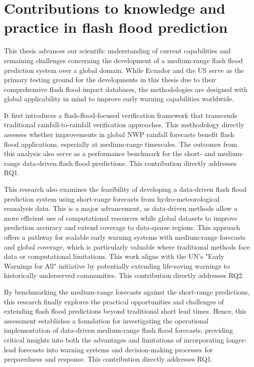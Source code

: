 \section{Contributions to knowledge and practice in flash flood prediction}

This thesis advances our scientific understanding of current capabilities and remaining challenges concerning the development of a medium-range flash flood prediction system over a global domain. While Ecuador and the US serve as the primary testing ground for the developments in this thesis due to their comprehensive flash flood impact databases, the methodologies are designed with global applicability in mind to improve early warning capabilities worldwide.

It  first introduces a flash-flood-focused verification framework that transcends traditional rainfall-to-rainfall verification approaches. This methodology directly assesses whether improvements in global NWP rainfall forecasts benefit flash flood applications, especially at medium-range timescales. The outcomes from this analysis also serve as a performance benchmark for the short- and medium-range data-driven flash flood predictions. This contribution directly addresses RQ1.

This  research also examines the feasibility of developing a data-driven flash flood prediction system using short-range forecasts from hydro-meteorological reanalysis data. This is a major advancement, as data-driven methods allow a more efficient use of computational resources while global datasets to improve prediction accuracy and extend coverage to data-sparse regions. This approach offers a pathway for scalable early warning systems with medium-range forecasts and global coverage, which is particularly valuable where traditional methods face data or computational limitations. This work aligns with the UN's "Early Warnings for All" initiative by potentially extending life-saving warnings to historically underserved communities. This contribution directly addresses RQ2.

By  benchmarking the medium-range forecasts against the short-range predictions, this research finally explores the practical opportunities and challenges of extending flash flood predictions beyond traditional short lead times. Hence, this assessment establishes a foundation for investigating the operational implementation of data-driven medium-range flash flood forecasts, providing critical insights into both the advantages and limitations of incorporating longer-lead forecasts into warning systems and decision-making processes for preparedness and response. This contribution directly addresses RQ1.

